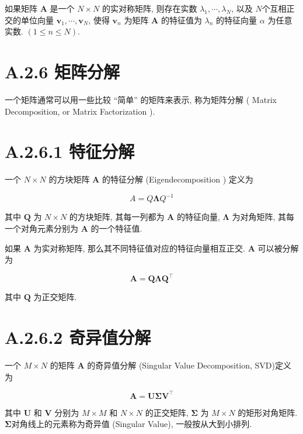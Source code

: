\documentclass[10pt]{article}
\begin{document}
如果矩阵 $\boldsymbol{A}$ 是一个 $N \times N$ 的实对称矩阵, 则存在实数 $\lambda_{1}, \cdots, \lambda_{N}$, 以及 $N$个互相正交的单位向量 $\boldsymbol{v}_{1}, \cdots, \boldsymbol{v}_{N}$, 使得 $\boldsymbol{v}_{n}$ 为矩阵 $\boldsymbol{A}$ 的特征值为 $\lambda_{n}$ 的特征向量 $\alpha$ 为任意实数. $(1 \leq n \leq N)$.

\section*{A.2.6 矩阵分解}
一个矩阵通常可以用一些比较 “简单” 的矩阵来表示, 称为矩阵分解 ( Matrix Decomposition, or Matrix Factorization ).

\section*{A.2.6.1 特征分解}
一个 $N \times N$ 的方块矩阵 $\boldsymbol{A}$ 的特征分解 (Eigendecomposition ) 定义为


\begin{equation*}
A=Q \boldsymbol{\Lambda} Q^{-1} \tag{A.40}
\end{equation*}


其中 $\boldsymbol{Q}$ 为 $N \times N$ 的方块矩阵, 其每一列都为 $\boldsymbol{A}$ 的特征向量, $\boldsymbol{\Lambda}$ 为对角矩阵, 其每一个对角元素分别为 $\boldsymbol{A}$ 的一个特征值.

如果 $\boldsymbol{A}$ 为实对称矩阵, 那么其不同特征值对应的特征向量相互正交. $\boldsymbol{A}$ 可以被分解为


\begin{equation*}
\boldsymbol{A}=\boldsymbol{Q} \boldsymbol{\Lambda} \boldsymbol{Q}^{\top} \tag{A.41}
\end{equation*}


其中 $\boldsymbol{Q}$ 为正交矩阵.

\section*{A.2.6.2 奇异值分解}
一个 $M \times N$ 的矩阵 $\boldsymbol{A}$ 的奇异值分解 (Singular Value Decomposition, SVD)定义为


\begin{equation*}
\boldsymbol{A}=\boldsymbol{U} \boldsymbol{\Sigma} \boldsymbol{V}^{\top} \tag{A.42}
\end{equation*}


其中 $\boldsymbol{U}$ 和 $\boldsymbol{V}$ 分别为 $M \times M$ 和 $N \times N$ 的正交矩阵, $\boldsymbol{\Sigma}$ 为 $M \times N$ 的矩形对角矩阵. $\boldsymbol{\Sigma}$对角线上的元素称为奇异值 (Singular Value), 一般按从大到小排列.
\end{document}
